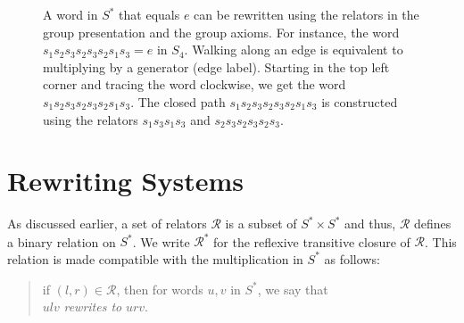 \documentclass[utf8]{Frontiers_LaTex_Templates/frontiersFPHY} %
\newcommand{\id}{e}
\newcommand{\rws}{\mathcal{R}}
\numberwithin{equation}{section}
\begin{document}
\begin{figure}[ht]
\begin{center}
  \caption[Loops on a Cayley Graph]{A word in $S^*$ that equals $\id$ can be rewritten using the relators in the group presentation and the group axioms. For instance, the word $s_1s_2s_3s_2s_3s_2s_1s_3 = \id $ in $S_4$.
  Walking along an edge is equivalent to multiplying by a generator (edge label). Starting in the top left corner and tracing the word clockwise, we get the word $s_1s_2s_3s_2s_3s_2s_1s_3$. The closed path  $s_1s_2s_3s_2s_3s_2s_1s_3$ is constructed using the relators $s_1s_3s_1s_3$ and $s_2s_3s_2s_3s_2s_3$.}
  \label{fig:cayleyg}
  \end{center}
  \end{figure}
\section{Rewriting Systems}\label{sec:rws}
As discussed earlier, a set of relators $\mathcal{R}$ is a subset of $S^* \times S^*$ and thus, $\mathcal{R}$ defines a binary relation on $S^*$.  We write $\rws^*$ for the reflexive transitive closure of $\rws$. 
%
This relation is made compatible with the multiplication in $S^*$ as follows: 
\begin{quote}
if $(l, r) \in \mathcal{R}$, then for words $u,v$ in $S^*$, we say that\\ 
$ulv$ \emph{rewrites to} $urv$.
\end{quote}
\end{document}
